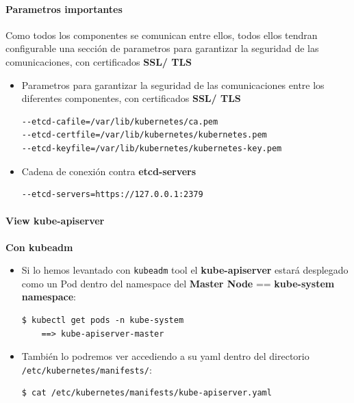 \documentclass{article}
\newenvironment{blocktemplate}[1]{%
    \tcolorbox[beamer,%
    noparskip,breakable,
    colframe=Blue,%
    colbacklower=LimeGreen!75!LightGreen,%
    title=#1]}%
    {\endtcolorbox}
\newenvironment{codetemplate}[1][]{%
  \mybasecolorbox[#1]
  \itshape
}{%
  \endmybasecolorbox
}
\begin{document}
\paragraph{Parametros importantes}

\begin{blocktemplate}{Note}
\label{SSLCerts}
Como todos los componentes se comunican entre ellos, todos ellos tendran configurable una sección de parametros para garantizar la seguridad de las comunicaciones, con certificados \textbf{SSL/ TLS}
\end{blocktemplate}

\begin{itemize}
    \item Parametros para garantizar la seguridad de las comunicaciones entre los diferentes componentes, con certificados \textbf{SSL/ TLS}
\begin{codetemplate}{}
\begin{verbatim}
--etcd-cafile=/var/lib/kubernetes/ca.pem
--etcd-certfile=/var/lib/kubernetes/kubernetes.pem
--etcd-keyfile=/var/lib/kubernetes/kubernetes-key.pem
\end{verbatim}
\end{codetemplate}

    \item Cadena de conexión contra \textbf{etcd-servers}
\begin{codetemplate}{}
\begin{verbatim}
--etcd-servers=https://127.0.0.1:2379
\end{verbatim}
\end{codetemplate}
\end{itemize}

\paragraph{View kube-apiserver}

\textbf{Con kubeadm}

\begin{itemize}
    \item Si lo hemos levantado con \verb|kubeadm| tool el \textbf{kube-apiserver} estará desplegado como un Pod dentro del namespace del \textbf{Master Node} == \textbf{kube-system namespace}:
\begin{codetemplate}{}
\begin{verbatim}
$ kubectl get pods -n kube-system
    ==> kube-apiserver-master
\end{verbatim}
\end{codetemplate}

     \item También lo podremos ver accediendo a su yaml dentro del directorio \verb|/etc/kubernetes/manifests/|:
\begin{codetemplate}{}
\begin{verbatim}
$ cat /etc/kubernetes/manifests/kube-apiserver.yaml
\end{verbatim}
\end{codetemplate}
\end{itemize}
\end{document}
